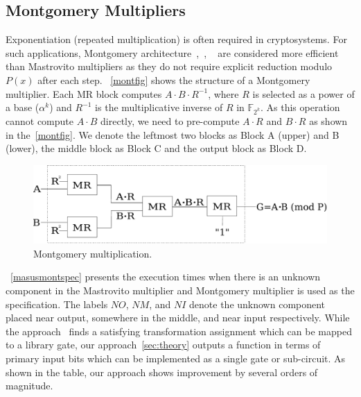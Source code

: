 \subsection{Montgomery Multipliers}
Exponentiation (repeated multiplication) is often required in cryptosystems.  
For such applications, Montgomery architecture~\cite{acar:1998},~\cite{wu:2002},
~\cite{knezevic:2008} are considered more efficient than Mastrovito multipliers
as they do not require explicit reduction modulo $P(x)$ after each step.
~\autoref{montfig} shows the structure of a Montgomery
multiplier. Each MR block computes $A\cdot B\cdot R^{-1}$, where $R$
is selected as a power of a base ($\alpha^{k}$) and $R^{-1}$ is the multiplicative 
inverse of $R$ in $\mathbb{F}_{2^k}$. As this operation cannot compute $A\cdot B$
directly, we need to pre-compute $A\cdot R$ and $B\cdot R$ as shown in the~\autoref{montfig}. 
We denote the leftmost
two blocks as Block A (upper) and B (lower), the middle block as Block
C and the output block as Block D.

\begin{figure}[H]
  \centering
  \includegraphics[scale=0.34]{new_mmcircuit-eps-converted-to}
  \caption{Montgomery multiplication.}
  \label{montfig}
  \end{figure}
\vspace{-0.05in}

~\autoref{masusmontspec} presents the execution times when there is an unknown component in the Mastrovito multiplier and Montgomery multiplier is used as the specification. The labels $NO$, $NM$, and $NI$ denote the unknown component placed near output, somewhere in the middle, and near input respectively. While the approach~\cite{fujita:2015} finds a satisfying transformation assignment which can be mapped to a library gate, our approach~\autoref{sec:theory} outputs a function in terms of primary input bits which can be implemented as a single gate or sub-circuit. As shown in the table, our approach shows improvement by several orders of magnitude.

